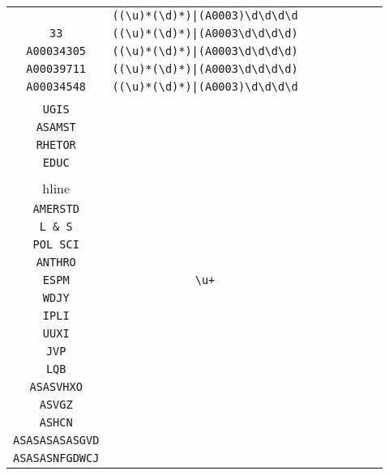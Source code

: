 \begin{longtable}{cccccccc}
\begin{tabular}{ll}
    \verb|A00038227| & \verb.((\u)*(\d)*)|(A0003)\d\d\d\d.\\
\verb|33| & \verb.((\u)*(\d)*)|(A0003\d\d\d\d).\\
\verb|A00034305| & \verb.((\u)*(\d)*)|(A0003\d\d\d\d).\\
\verb|A00039711| & \verb.((\u)*(\d)*)|(A0003\d\d\d\d).\\
\verb|A00034548| & \verb.((\u)*(\d)*)|(A0003)\d\d\d\d.
\end{tabular}
\\\midrule 
\begin{tabular}{l}
    \verb|EPS|\\
\verb|UGIS|\\
\verb|ASAMST|\\
\verb|RHETOR|\\
\verb|EDUC|\\
\\hline\\
\verb|AMERSTD|\\
\verb|L & S|\\
\verb|POL SCI|\\
\verb|ANTHRO|\\
\verb|ESPM|
\end{tabular}

&
\verb|\u+|
&

\begin{tabular}{l}
    \verb|(\u)*\u\u\u|\\
\verb|WDJY|\\
\verb|IPLI|\\
\verb|UUXI|\\
\verb|JVP|\\
\verb|LQB|
\end{tabular}

&

\begin{tabular}{l}
    \verb|(AS)*(\u)*\u\u\u|\\
\verb|ASASVHXO|\\
\verb|ASVGZ|\\
\verb|ASHCN|\\
\verb|ASASASASASGVD|\\
\verb|ASASASNFGDWCJ|
\end{tabular}

&


\end{longtable}
